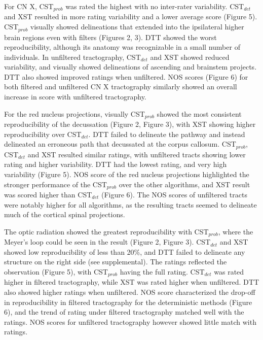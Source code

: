 For CN X, CST$_{prob}$ was rated the highest with no inter-rater variability. CST$_{det}$ and XST resulted in more rating variability and a lower average score (Figure 5). CST$_{prob}$ visually showed delineations that extended into the ipsilateral higher brain regions even with filters (Figures 2, 3). DTT showed the worst reproducibility, although its anatomy was recognizable in a small number of individuals.  In unfiltered tractography, CST$_{det}$ and XST showed reduced variability, and visually showed delineations of ascending and brainstem projects. DTT also showed improved ratings when unfiltered. NOS scores (Figure 6) for both filtered and unfiltered CN X tractography similarly showed an overall increase in score with unfiltered tractography. 

For the red nucleus projections, visually CST$_{prob}$ showed the most consistent reproducibility of the decussation (Figure 2, Figure 3), with XST showing higher reproducibility over CST$_{det}$. DTT failed to delineate the pathway and instead delineated an erroneous path that decussated at the corpus callosum. CST$_{prob}$, CST$_{det}$ and XST resulted similar ratings, with unfiltered tracts showing lower rating and higher variability. DTT had the lowest rating, and very high variability (Figure 5). NOS score of the red nucleus projections highlighted the stronger performance of the CST$_{prob}$ over the other algorithms, and XST result was scored higher than CST$_{det}$ (Figure 6). The NOS scores of unfiltered tracts were notably higher for all algorithms, as the resulting tracts seemed to delineate much of the cortical spinal projections. 

 The optic radiation showed the greatest reproducibility with CST$_{prob}$, where the Meyer’s loop could be seen in the result (Figure 2, Figure 3). CST$_{det}$ and XST showed low reproducibility of less than 20\%, and DTT failed to delineate any structure on the right side (see supplemental). The ratings reflected the observation (Figure 5), with CST$_{prob}$ having the full rating. CST$_{det}$ was rated higher in filtered tractography, while XST was rated higher when unfiltered. DTT also showed higher ratings when unfiltered. NOS score characterized the drop-off in reproducibility in filtered tractography for the deterministic methods (Figure 6), and the trend of rating under filtered tractography matched well with the ratings. NOS scores for unfiltered tractography however showed little match with ratings. 
 
